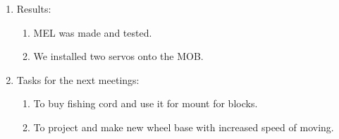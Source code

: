 \begin{enumerate}
\begin{enumerate}
	\end{enumerate}
	
	\item Results:
	\begin{enumerate}
		
		\item MEL was made and tested.
		
		\item We installed two servos onto the MOB.

	\end{enumerate}
	
	\item Tasks for the next meetings:
	\begin{enumerate}
		
		\item To buy fishing cord and use it for mount for blocks.
		
		\item To project and make new wheel base with increased speed of moving.

	\end{enumerate}
\end{enumerate}
\fillpage
